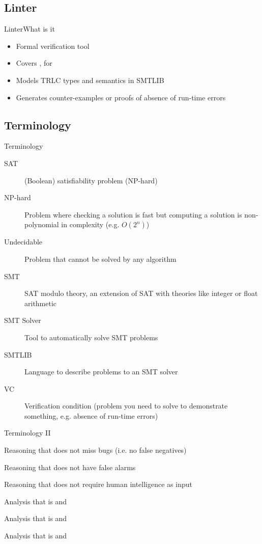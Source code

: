 \documentclass[aspectratio=169]{beamer}
\begin{document}
\subsection{Linter}
\begin{frame}{Linter}{What is it}
  \begin{itemize}
  \item Formal verification tool
  \item Covers , for 
  \item Models TRLC types and semantics in SMTLIB
  \item Generates counter-examples or proofs of absence of run-time
    errors
  \end{itemize}
\end{frame}

\subsection{Terminology}
\begin{frame}{Terminology}
  \begin{description}
  \item[SAT] (Boolean) satisfiability problem (NP-hard)
  \item[NP-hard] Problem where checking a solution is fast but
    computing a solution is non-polynomial in complexity
    (e.g. $O(2^n)$)
  \item[Undecidable] Problem that cannot be solved by any algorithm
  \item[SMT] SAT modulo theory, an extension of SAT with theories like
    integer or float arithmetic
  \item[SMT Solver] Tool to automatically solve SMT problems
  \item[SMTLIB] Language to describe problems to an SMT solver
  \item[VC] Verification condition (problem you need to solve to
    demonstrate something, e.g. absence of run-time errors)
  \end{description}
\end{frame}

\begin{frame}{Terminology II}
  \begin{description}
  \item[Sound] Reasoning that does not miss bugs (i.e. no
    false negatives)
  \item[Complete] Reasoning that does not have false alarms
  \item[Automatic] Reasoning that does not require human intelligence
    as input
  \item[Over-approximate] Analysis that is  and
  \item[Under-approximate] Analysis that is  and
  \item[Deductive] Analysis that is  and
  \end{description}
\end{frame}
\end{document}
